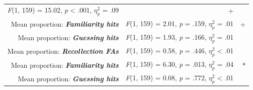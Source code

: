 \documentclass[
  11pt,
]{article}
\begin{document}
\begin{longtable}[]{@{}rrr@{}}
\begin{minipage}[t]{0.46\columnwidth}
\emph{F}(1, 159) = 15.02, \emph{p} \textless{} .001, \(\eta^2_p\) =
.09\strut
\end{minipage} & \begin{minipage}[t]{0.07\columnwidth}\raggedleft
+\strut
\end{minipage}\tabularnewline
\begin{minipage}[t]{0.38\columnwidth}\raggedleft
Mean proportion: \textbf{\emph{Familiarity hits}}\strut
\end{minipage} & \begin{minipage}[t]{0.46\columnwidth}\raggedleft
\emph{F}(1, 159) = 2.01, \emph{p} = .159, \(\eta^2_p\) = .01\strut
\end{minipage} & \begin{minipage}[t]{0.07\columnwidth}\raggedleft
+\strut
\end{minipage}\tabularnewline
\begin{minipage}[t]{0.38\columnwidth}\raggedleft
Mean proportion: \textbf{\emph{Guessing hits}}\strut
\end{minipage} & \begin{minipage}[t]{0.46\columnwidth}\raggedleft
\emph{F}(1, 159) = 1.93, \emph{p} = .166, \(\eta^2_p\) = .01\strut
\end{minipage} & \begin{minipage}[t]{0.07\columnwidth}\raggedleft
\strut
\end{minipage}\tabularnewline
\begin{minipage}[t]{0.38\columnwidth}\raggedleft
Mean proportion: \textbf{\emph{Recollection FAs}}\strut
\end{minipage} & \begin{minipage}[t]{0.46\columnwidth}\raggedleft
\emph{F}(1, 159) = 0.58, \emph{p} = .446, \(\eta^2_p\) \textless{}
.01\strut
\end{minipage} & \begin{minipage}[t]{0.07\columnwidth}\raggedleft
\strut
\end{minipage}\tabularnewline
\begin{minipage}[t]{0.38\columnwidth}\raggedleft
Mean proportion: \textbf{\emph{Familiarity hits}}\strut
\end{minipage} & \begin{minipage}[t]{0.46\columnwidth}\raggedleft
\emph{F}(1, 159) = 6.30, \emph{p} = .013, \(\eta^2_p\) = .04\strut
\end{minipage} & \begin{minipage}[t]{0.07\columnwidth}\raggedleft
*\strut
\end{minipage}\tabularnewline
\begin{minipage}[t]{0.38\columnwidth}\raggedleft
Mean proportion: \textbf{\emph{Guessing hits}}\strut
\end{minipage} & \begin{minipage}[t]{0.46\columnwidth}\raggedleft
\emph{F}(1, 159) = 0.08, \emph{p} = .772, \(\eta^2_p\) \textless{}
.01\strut
\end{minipage} & \begin{minipage}[t]{0.07\columnwidth}\raggedleft
\strut
\end{minipage}\tabularnewline
\bottomrule
\end{longtable}
\end{document}
